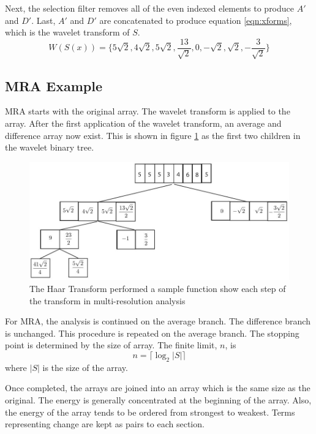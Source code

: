 Next, the selection filter removes all of the even indexed elements to produce $A'$ and $D'$.  Last,  $A'$ and $D'$ are concatenated to produce equation \ref{eqn:xforms}, which is the wavelet transform of $S$.  
\begin{equation*}
\label{eqn:xforms}
W(S(x)) = \{ 5\sqrt{2}, 4\sqrt{2}, 5\sqrt{2} , \frac{13}{\sqrt{2}}, 0, -\sqrt {2} , \sqrt{2}, -\frac{3}{\sqrt{2}} \}
\end{equation*}


\subsection {MRA Example}

MRA starts with the original array.  The wavelet transform is applied to the array.   After the first application of the wavelet transform, an average and difference array now exist.  This is shown in figure \ref{nummra} as the first two children in the wavelet binary tree.

\begin{figure}
\includegraphics [width=6in]{mraexample2.jpg}
\caption{The Haar Transform performed a sample function show each step of the transform in multi-resolution analysis }
\label{nummra}
\end{figure}

For MRA, the analysis is continued on the average branch.  The difference branch is unchanged.  This procedure is repeated on the average branch.   The stopping point is determined by the size of array.  The finite limit, $n$, is 
\begin{equation} \label{eqn:treeheight} \displaystyle
n = \lceil\log_2 \left|S\right|\rceil
\end{equation}
where $\left|S\right|$ is the size of the array.

Once completed, the arrays are joined into an array which is the same
size as the original.  The energy is generally concentrated at the
beginning of the array.  Also, the energy of the array tends to be
ordered from strongest to weakest.  Terms representing change are kept
as pairs to each section.

